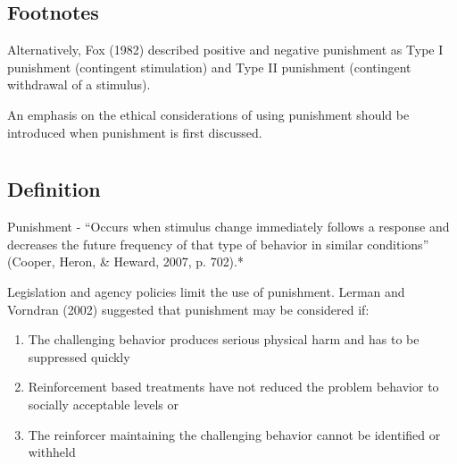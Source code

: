 \subsection{Footnotes}
Alternatively, Fox (1982) described positive and negative punishment as Type I punishment (contingent stimulation) and Type II punishment (contingent withdrawal of a stimulus).

An emphasis on the ethical considerations of using punishment should be introduced when punishment is first discussed.
%
%
%
%
%
%
%
%
%
%
%
%
\section[\fourdSeventeen{}]{\fourdSeventeen{}%
              }
\subsection{Definition}
Punishment - ``Occurs when stimulus change immediately follows a response and decreases the future frequency of that type of behavior in similar conditions'' (Cooper, Heron, \& Heward, 2007, p. 702).*

Legislation and agency policies limit the use of punishment. Lerman and Vorndran (2002) suggested that punishment may be considered if:
\begin{enumerate}
\item The challenging behavior produces serious physical harm and has to be suppressed quickly
\item Reinforcement based treatments have not reduced the problem behavior to socially acceptable levels or 
\item The reinforcer maintaining the challenging behavior cannot be identified or withheld 
\end{enumerate}

